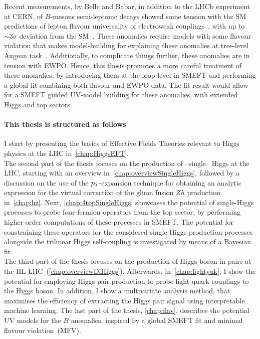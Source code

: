 \par Recent measurements, by Belle and Babar, in addition to the LHCb experiment at CERN, of $B$-mesons semi-leptonic decays showed some tension with the SM predictions of lepton flavour universality of electroweak couplings~\cite{Aaij:2014ora,Aaij:2017vbb,Aaij:2019wad,Abdesselam:2019wac,LHCb:2021trn}, with up to $\sim 3\sigma$ deviation from the SM~\cite{Chatrchyan:2013bka,Aaij:2017vad,Aaboud:2018mst,Aaij:2020nol}. These anomalies require models with some flavour violation that makes model-building for explaining these anomalies at tree-level  Augean task~\cite{DiLuzio:2017vat,Calibbi:2017qbu,Bordone:2017bld,Barbieri:2017tuq,Assad:2017iib,Heeck:2018ntp,Fornal:2018dqn,Crivellin:2018yvo,Crivellin:2019dwb,Bordone:2019uzc}. Additionally, to complicate things further, these anomalies are in tension with EWPO. Hence, this thesis promotes a more careful treatment of these anomalies, by introducing them at the loop level in SMEFT and performing a global fit combining both flavour and EWPO data. The fit result would allow for a SMEFT guided UV-model building for these anomalies, with extended Higgs and top sectors. 
\paragraph{This thesis is structured as follows\color{Cayenne}{:}}
I start by presenting the basics of Effective Fields Theories relevant to Higgs physics at the LHC in~\autoref{chap:HiggsEFT}. \\ The second part of the thesis focuses on the production of --single-- Higgs at the LHC, starting with an overview in~\autoref{chap:overviewSingleHiggs}, followed by a discussion on the use of the $p_{\scriptscriptstyle T}$-expansion technique for obtaining an analytic expression for the virtual correction of the gluon fusion $Zh$ production in~\autoref{chap:hz}. Next, \autoref{chap:4topSingleHiggs} showcases the potential of single-Higgs processes to probe four-fermion operators from the top sector, by performing higher-order computations of these processes in SMEFT. The potential for constraining these operators for the considered single-Higgs production processes alongside the trilinear Higgs self-coupling is investigated by means of a Bayesian fit. \\ The third part of the thesis focuses on the production of Higgs boson in pairs at the HL-LHC~(\autoref{chap:overviewDiHiggs}). Afterwards, in~\autoref{chap:lightyuk}, I show the potential for employing Higgs pair production to probe light quark couplings to the Higgs boson. In addition, I show a multivariate analysis method, that maximises the efficiency of extracting the Higgs pair signal using interpretable machine learning.  The last part of the thesis, \autoref{chap:flav}, describes the potential UV models for the $B$ anomalies, inspired by a global SMEFT fit and minimal flavour violation~(MFV). 









